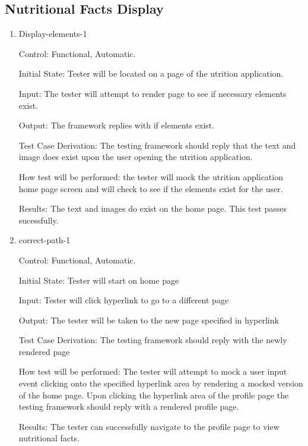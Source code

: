 \documentclass[12pt, titlepage]{article}
\begin{document}
	\subsection{Nutritional Facts Display}
	\begin{enumerate}
		\item{Display-elements-1\\}
		
		Control: Functional, Automatic.
		
		Initial State: Tester will be located on a page of the utrition application.
		
		Input: The tester will attempt to render page to see if necessary elements exist.
		
		Output: The framework replies with if elements exist.
		
		Test Case Derivation: The testing framework should reply that the text and image does exist upon the user opening the utrition application.
		
		How test will be performed: the tester will mock the utrition application home page screen and will check to see if the elements exist for the user.

		Results: The text and images do exist on the home page. This test passes sucessfully.

		\item{correct-path-1\\}
		
		Control: Functional, Automatic.
		
		Initial State: Tester will start on home page
		
		Input: Tester will click hyperlink to go to a different page
		
		Output: The tester will be taken to the new page specified in hyperlink
		
		Test Case Derivation: The testing framework should reply with the newly rendered page
		
		How test will be performed: The tester will attempt to mock a user input event clicking onto the specified hyperlink area by rendering a mocked version of the home page. Upon clicking the hyperlink area of the profile page the testing framework should reply with a rendered profile page.

		Results: The tester can successfully navigate to the profile page to view nutritional facts.

	\end{enumerate}
\end{document}
